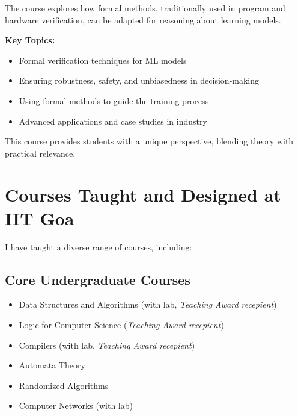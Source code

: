 \documentclass[11pt,a4paper,sans]{moderncv} %
\begin{document}
The course explores how formal methods, traditionally used in program and hardware verification, can be adapted for reasoning about learning models.

\textbf{Key Topics:}
\begin{itemize}
    \item Formal verification techniques for ML models
    \item Ensuring robustness, safety, and unbiasedness in decision-making
    \item Using formal methods to guide the training process
    \item Advanced applications and case studies in industry \\
\end{itemize}

This course provides students with a unique perspective, blending theory with practical relevance.

\section{Courses Taught and Designed at IIT Goa}
I have taught a diverse range of courses, including:

\subsection*{Core Undergraduate Courses}
\begin{varwidth}[t]{.71\textwidth}
\begin{itemize}
    \item Data Structures and Algorithms (with lab, \emph{Teaching Award recepient})
    \item Logic for Computer Science (\emph{Teaching Award recepient})
    \item Compilers (with lab, \emph{Teaching Award recepient})
\end{itemize}

\end{varwidth}%
\hspace{3em}%
\begin{varwidth}[t]{.5\textwidth}
 \begin{itemize}
    \item Automata Theory
    \item Randomized Algorithms
    \item Computer Networks (with lab)
\end{itemize}
\end{varwidth}
\end{document}
